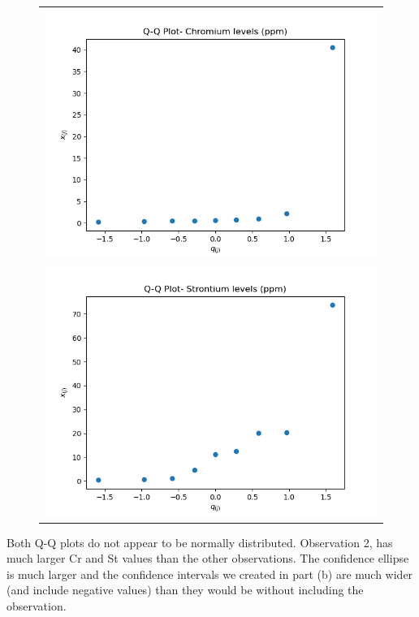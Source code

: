 \begin{enumerate}[label=(\alph*)]
    \begin{figure}[H]
        \centering
        \begin{tabular}{c}
            \includegraphics[scale=0.75]{./python/chapter-5/Question-5-11-c-QQ-Cr.png} \\
            \includegraphics[scale=0.75]{./python/chapter-5/Question-5-11-c-QQ-St.png}
        \end{tabular}
    \end{figure}

    Both Q-Q plots do not appear to be normally distributed. Observation 2, has much larger Cr and St values than the other observations. The confidence ellipse is much larger and the confidence intervals we created in part (b) are much wider (and include negative values) than they would be without including the observation.


\end{enumerate}

